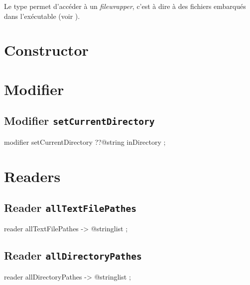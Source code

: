 

Le type  permet d'accéder à un \emph{filewrapper}, c'est à dire à des fichiers embarqués dans l'exécutable (voir ).

\section{Constructor}

\section{Modifier}

\subsection{Modifier \texttt{setCurrentDirectory}}

\begin{galgascode}
modifier setCurrentDirectory ??@string inDirectory ;
\end{galgascode}


\section{Readers}




\subsection{Reader \texttt{allTextFilePathes}}

\begin{galgascode}
reader allTextFilePathes -> @stringlist ;
\end{galgascode}






\subsection{Reader \texttt{allDirectoryPathes}}

\begin{galgascode}
reader allDirectoryPathes -> @stringlist ;
\end{galgascode}






